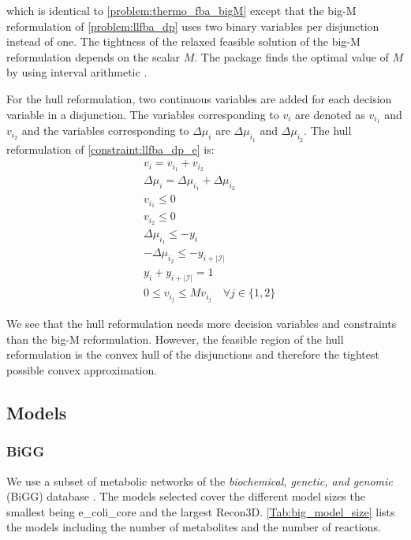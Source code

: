 \quad which is identical to \cref{problem:thermo_fba_bigM} except that the big-M reformulation of \cref{problem:llfba_dp} uses two binary variables per disjunction instead of one.
The tightness of the relaxed feasible solution of the big-M reformulation depends on the scalar $M$. The package finds the optimal value of $M$ by using interval arithmetic \cite{hutchison_automating_2010}.

For the hull reformulation, two continuous variables are added for each decision variable in a disjunction. The variables corresponding to $v_i$ are denoted as $v_{i_1}$ and $v_{i_2}$ and the variables corresponding to $\Delta \mu_i$ are $\Delta \mu_{i_1}$ and $\Delta \mu_{i_2}$. The hull reformulation of \cref{constraint:llfba_dp_e} is:
\begin{align*}
    &v_i = v_{i_1} + v_{i_2} \\
    &\Delta \mu_i = \Delta \mu_{i_1} + \Delta \mu_{i_2} \\
    &v_{i_1} \leq 0 \\
    &v_{i_2} \leq 0 \\
    &\Delta \mu_{i_1} \leq - y_i \\ 
    &- \Delta \mu_{i_2} \leq -y_{i + |\mathcal{I}|} \\
    &y_i + y_{i + |\mathcal{I}|} = 1 \\
    &0 \leq v_{i_j} \leq M v_{i_j}  \quad \forall j \in \{1,2\}
\end{align*}

We see that the hull reformulation needs more decision variables and constraints than the big-M reformulation. However, the feasible region of the hull reformulation is the convex hull of the disjunctions and therefore the tightest possible convex approximation. 


\subsection{Models} \label{section:models}
\subsubsection{BiGG}
We use a subset of metabolic networks of the \textit{biochemical, genetic, and genomic} (BiGG) database \cite{BiGG}. The models selected cover the different model sizes the smallest being \textsf{e\_coli\_core} and the largest \textsf{Recon3D}. \cref{Tab:big_model_size} lists the models including the number of metabolites and the number of reactions.

